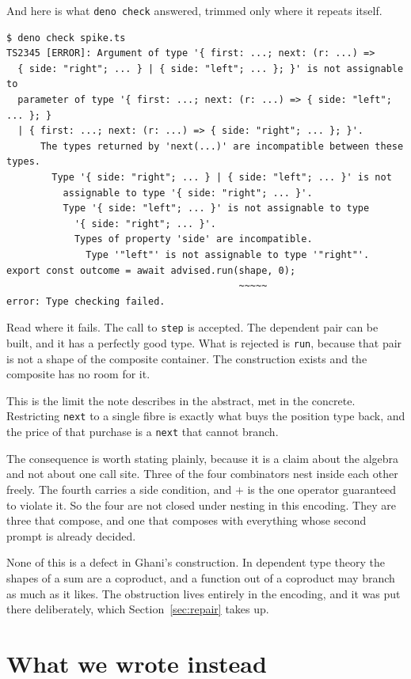 \documentclass[11pt,a4paper]{article}
\begin{document}
And here is what \texttt{deno check} answered, trimmed only where it repeats itself.

\begin{lstlisting}[language=SH]
$ deno check spike.ts
TS2345 [ERROR]: Argument of type '{ first: ...; next: (r: ...) =>
  { side: "right"; ... } | { side: "left"; ... }; }' is not assignable to
  parameter of type '{ first: ...; next: (r: ...) => { side: "left"; ... }; }
  | { first: ...; next: (r: ...) => { side: "right"; ... }; }'.
      The types returned by 'next(...)' are incompatible between these types.
        Type '{ side: "right"; ... } | { side: "left"; ... }' is not
          assignable to type '{ side: "right"; ... }'.
          Type '{ side: "left"; ... }' is not assignable to type
            '{ side: "right"; ... }'.
            Types of property 'side' are incompatible.
              Type '"left"' is not assignable to type '"right"'.
export const outcome = await advised.run(shape, 0);
                                         ~~~~~
error: Type checking failed.
\end{lstlisting}

Read where it fails. The call to \texttt{step} is accepted. The dependent pair can be built,
and it has a perfectly good type. What is rejected is \texttt{run}, because that pair is not a
shape of the composite container. The construction exists and the composite has no room for it.

This is the limit the note describes in the abstract, met in the concrete. Restricting
\texttt{next} to a single fibre is exactly what buys the position type back, and the price of
that purchase is a \texttt{next} that cannot branch.

The consequence is worth stating plainly, because it is a claim about the algebra and not about
one call site. Three of the four combinators nest inside each other freely. The fourth carries
a side condition, and $+$ is the one operator guaranteed to violate it. So the four are not
closed under nesting in this encoding. They are three that compose, and one that composes with
everything whose second prompt is already decided.

None of this is a defect in Ghani's construction. In dependent type theory the shapes of a sum
are a coproduct, and a function out of a coproduct may branch as much as it likes. The
obstruction lives entirely in the encoding, and it was put there deliberately, which
Section~\ref{sec:repair} takes up.

\section{What we wrote instead}
\end{document}
